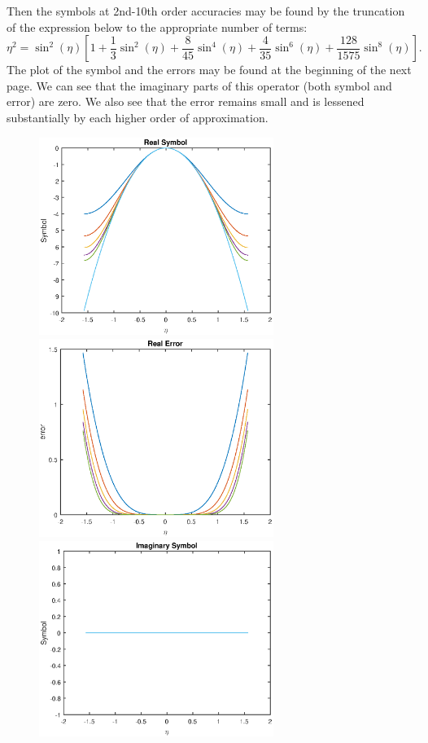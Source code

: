 Then the symbols at 2nd-10th order accuracies may be found by the truncation of the expression below to the appropriate number of terms:
$$\eta^2=\sin^2(\eta)\left[1+\frac{1}{3}\sin^2(\eta)+\frac{8}{45}\sin^4(\eta)+\frac{4}{35}\sin^6(\eta)+\frac{128}{1575}\sin^8(\eta)\right].$$
The plot of the symbol and the errors may be found at the beginning of the next page. We can see that the imaginary parts of this operator (both symbol and error) are zero. We also see that the error remains small and is lessened substantially by each higher order of approximation.
\pagebreak
\begin{figure}[ht]
\centering
\includegraphics[width=3in]{real_sym2}
\includegraphics[width=3in]{real_err2}\\
\includegraphics[width=3in]{imag_sym2}

\end{figure}
